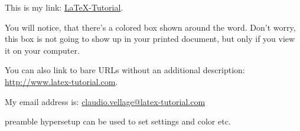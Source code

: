 \documentclass{article} %
\begin{document}
This is my link: \href{http://www.latex-tutorial.com}{LaTeX-Tutorial}.

You will notice, that there's a colored box shown around the word. Don't worry, this box is not going to show up in your printed document, but only if you view it on your computer.

You can also link to bare URLs without an additional description: \url{http://www.latex-tutorial.com}.

My email address is: \href{mailto:claudio.vellage@latex-tutorial.com}{claudio.vellage@latex-tutorial.com}

preamble hypersetup can be used to set settings and color etc.
\end{document}
